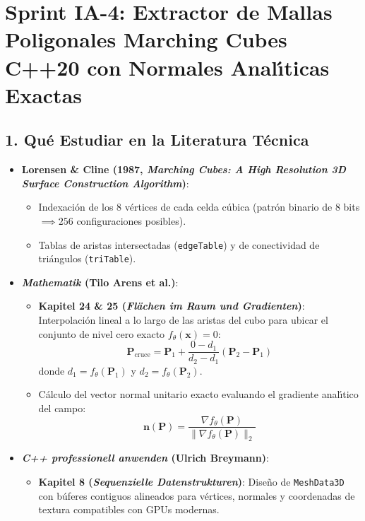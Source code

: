 \documentclass[11pt,a4paper]{article}
\begin{document}
\section{Sprint IA-4: Extractor de Mallas Poligonales Marching Cubes C++20 con Normales Anal{\'\i}ticas Exactas}

\subsection{1. Qu{\'e} Estudiar en la Literatura T{\'e}cnica}
\begin{itemize}
    \item \textbf{Lorensen \& Cline (1987, \textit{Marching Cubes: A High Resolution 3D Surface Construction Algorithm})}:
    \begin{itemize}
        \item Indexaci{\'o}n de los 8 v{\'e}rtices de cada celda c{\'u}bica (patr{\'o}n binario de 8 bits $\implies 256$ configuraciones posibles).
        \item Tablas de aristas intersectadas (\texttt{edgeTable}) y de conectividad de tri{\'a}ngulos (\texttt{triTable}).
    \end{itemize}
    \item \textbf{\textit{Mathematik} (Tilo Arens et al.)}:
    \begin{itemize}
        \item \textbf{Kapitel 24 \& 25 (\textit{Fl{\"a}chen im Raum und Gradienten})}: Interpolaci{\'o}n lineal a lo largo de las aristas del cubo para ubicar el conjunto de nivel cero exacto $f_\theta(\mathbf{x}) = 0$:
        \begin{equation}
            \mathbf{P}_{\text{cruce}} = \mathbf{P}_1 + \frac{0 - d_1}{d_2 - d_1} (\mathbf{P}_2 - \mathbf{P}_1)
        \end{equation}
        donde $d_1 = f_\theta(\mathbf{P}_1)$ y $d_2 = f_\theta(\mathbf{P}_2)$.
        \item C{\'a}lculo del vector normal unitario exacto evaluando el gradiente anal{\'\i}tico del campo:
        \begin{equation}
            \mathbf{n}(\mathbf{P}) = \frac{\nabla f_\theta(\mathbf{P})}{\|\nabla f_\theta(\mathbf{P})\|_2}
        \end{equation}
    \end{itemize}
    \item \textbf{\textit{C++ professionell anwenden} (Ulrich Breymann)}:
    \begin{itemize}
        \item \textbf{Kapitel 8 (\textit{Sequenzielle Datenstrukturen})}: Dise{\~n}o de \texttt{MeshData3D} con b{\'u}feres contiguos alineados para v{\'e}rtices, normales y coordenadas de textura compatibles con GPUs modernas.
    \end{itemize}
\end{itemize}
\end{document}
